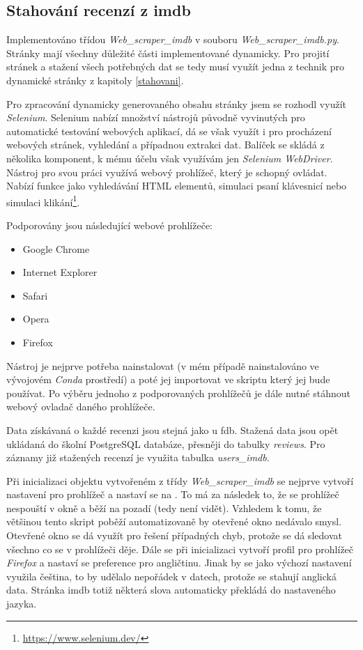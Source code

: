 \subsection{Stahování recenzí z imdb}
Implementováno třídou \emph{Web\_scraper\_imdb} v souboru \emph{Web\_scraper\_imdb.py}. Stránky mají všechny důležité části implementované dynamicky. Pro projití stránek a stažení všech potřebných dat se tedy musí využít jedna z technik pro dynamické stránky z kapitoly \ref{stahovani}. 

Pro zpracování dynamicky generovaného obsahu stránky jsem se rozhodl využít \emph{Selenium}. Selenium nabízí množství nástrojů původně vyvinutých pro automatické testování webových aplikací, dá se však využít i pro procházení webových stránek, vyhledání a případnou extrakci dat.
Balíček se skládá z několika komponent, k mému účelu však využívám jen \emph{Selenium WebDriver}.
Nástroj pro svou práci využívá webový prohlížeč, který je schopný ovládat. Nabízí funkce jako vyhledávání HTML elementů, simulaci psaní klávesnicí nebo simulaci klikání\footnote{\url{https://www.selenium.dev/}}. 

Podporovány jsou následující webové prohlížeče:
\begin{itemize}
    \item Google Chrome
    \item Internet Explorer 
    \item Safari
    \item Opera
    \item Firefox
\end{itemize}

Nástroj je nejprve potřeba nainstalovat (v mém případě nainstalováno ve vývojovém \emph{Conda} prostředí) a poté jej importovat ve skriptu který jej bude používat. Po výběru jednoho z podporovaných prohlížečů je dále nutné stáhnout webový ovladač daného prohlížeče. 

Data získávaná o každé recenzi jsou stejná jako u fdb. Stažená data jsou opět ukládaná do školní PostgreSQL databáze, přesněji do tabulky \emph{reviews}. Pro záznamy již stažených recenzí je využita tabulka \emph{users\_imdb}.

Při inicializaci objektu vytvořeném z třídy \emph{Web\_scraper\_imdb} se nejprve vytvoří nastavení pro prohlížeč a nastaví se  na . To má za následek to, že se prohlížeč nespouští v okně a běží na pozadí (tedy není vidět). Vzhledem k tomu, že většinou tento skript poběží automatizovaně by otevřené okno nedávalo smysl. Otevřené okno se dá využít pro řešení případných chyb, protože se dá sledovat všechno co se v prohlížeči děje. 
Dále se při inicializaci vytvoří profil pro prohlížeč \emph{Firefox} a nastaví se preference pro angličtinu. 
Jinak by se jako výchozí nastavení využila čeština, to by udělalo nepořádek v datech, protože se stahují anglická data. Stránka imdb totiž některá slova automaticky překládá do nastaveného jazyka. 

